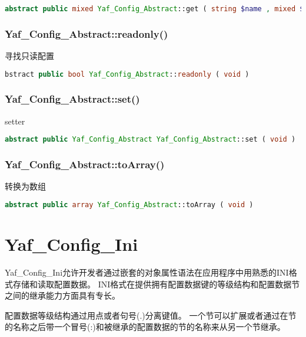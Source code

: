 \begin{lstlisting}[language=PHP]
abstract public mixed Yaf_Config_Abstract::get ( string $name , mixed $value )
\end{lstlisting}



\subsection{Yaf\_Config\_Abstract::readonly()}


寻找只读配置





\begin{lstlisting}[language=PHP]
bstract public bool Yaf_Config_Abstract::readonly ( void )
\end{lstlisting}

\subsection{Yaf\_Config\_Abstract::set()}

setter


\begin{lstlisting}[language=PHP]
abstract public Yaf_Config_Abstract Yaf_Config_Abstract::set ( void )
\end{lstlisting}

\subsection{Yaf\_Config\_Abstract::toArray()}

转换为数组

\begin{lstlisting}[language=PHP]
abstract public array Yaf_Config_Abstract::toArray ( void )
\end{lstlisting}



\chapter{Yaf\_Config\_Ini}



Yaf\_Config\_Ini允许开发者通过嵌套的对象属性语法在应用程序中用熟悉的INI格式存储和读取配置数据。 INI格式在提供拥有配置数据键的等级结构和配置数据节之间的继承能力方面具有专长。

配置数据等级结构通过用点或者句号(.)分离键值。 一个节可以扩展或者通过在节的名称之后带一个冒号(:)和被继承的配置数据的节的名称来从另一个节继承。

